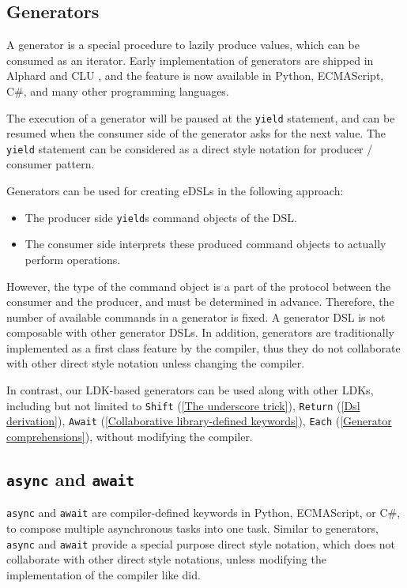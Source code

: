\subsection{Generators}

A generator is a special procedure to lazily produce values, which can be consumed as an iterator. Early implementation of generators are shipped in Alphard \cite{shaw1977abstraction} and CLU \cite{liskov1977abstraction}, and the feature is now available in Python, ECMAScript, C\#, and many other programming languages.

The execution of a generator will be paused at the \lstinline{yield} statement, and can be resumed when the consumer side of the generator asks for the next value. The \lstinline{yield} statement can be considered as a direct style notation for producer / consumer pattern.

Generators can be used for creating eDSLs in the following approach:

\begin{itemize}
  \item The producer side \lstinline{yield}s command objects of the DSL.
  \item The consumer side interprets these produced command objects to actually perform operations.
\end{itemize}

However, the type of the command object is a part of the protocol between the consumer and the producer, and must be determined in advance. Therefore, the number of available commands in a generator is fixed. A generator DSL is not composable with other generator DSLs. In addition, generators are traditionally implemented as a first class feature by the compiler, thus they do not collaborate with other direct style notation unless changing the compiler.

In contrast, our LDK-based generators can be used along with other LDKs, including but not limited to \lstinline{Shift} (\cref{The underscore trick}), \lstinline{Return} (\cref{Dsl derivation}), \lstinline{Await} (\cref{Collaborative library-defined keywords}), \lstinline{Each} (\cref{Generator comprehensions}), without modifying the compiler.

\subsection{\lstinline{async} and \lstinline{await}}

\lstinline{async} and \lstinline{await} are compiler-defined keywords in Python, ECMAScript, or C\#, to compose multiple asynchronous tasks into one task. Similar to generators, \lstinline{async} and \lstinline{await} provide a special purpose direct style notation, which does not collaborate with other direct style notations, unless modifying the implementation of the compiler like \cite{pep525} did.

